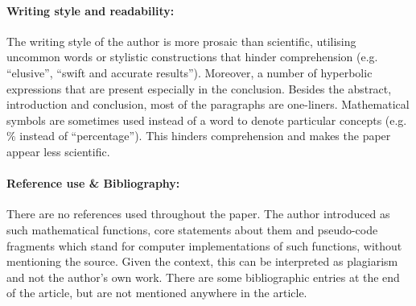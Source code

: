 \documentclass[12pt]{scrartcl}
\begin{document}



\paragraph{Writing style and readability:} The writing style of the author is
more prosaic than scientific, utilising uncommon words or stylistic
constructions that hinder comprehension (e.g. ``elusive'', ``swift and accurate
results''). Moreover, a number of hyperbolic expressions that are present especially 
in the conclusion. Besides the abstract, introduction and conclusion, most of the
paragraphs are one-liners. Mathematical symbols are sometimes used instead of a
word to denote particular concepts (e.g. $\%$ instead of ``percentage''). This
hinders comprehension and makes the paper appear less scientific.








\paragraph{Reference use \& Bibliography:} There are no references used
throughout the paper. The author introduced as such mathematical functions, core
statements about them and pseudo-code fragments which stand for computer
implementations of such functions, without mentioning the source. Given the
context, this can be interpreted as plagiarism and not the author's own work.
There are some bibliographic entries at the end of the article, but are not 
mentioned anywhere in the article.


\end{document}

